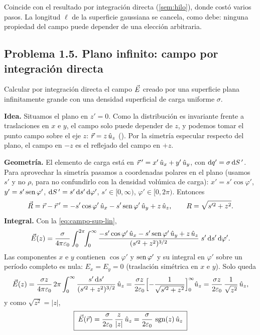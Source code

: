 \begin{observacion}[Comparación]
Coincide con el resultado por integración directa (\cref{sem:hilo}), donde costó varios pasos. La longitud $\ell$ de la superficie gaussiana se cancela, como debe: ninguna propiedad del campo puede depender de una elección arbitraria.
\end{observacion}



\subsection{Problema 1.5. Plano infinito: campo por integración directa}\label{sem:plano}
\begin{ejercicio}\label{ejer:plano}
Calcular por integración directa el campo $\vec{E}$ creado por una superficie plana infinitamente grande con una densidad superficial de carga uniforme $\sigma$.
\end{ejercicio}

\begin{resolucion}
\textbf{Idea.} Situamos el plano en $z'=0$. Como la distribución es invariante frente a traslaciones en $x$ e $y$, el campo solo puede depender de $z$, y podemos tomar el punto campo sobre el eje $z$: $\vec{r}=z\,\hat{u}_{z}$
(). Por la simetría especular respecto del plano, el campo en $-z$ es el reflejado del campo en $+z$.

\textbf{Geometría.} El elemento de carga está en $\vec{r}\,'=x'\,\hat{u}_{x}+y'\,\hat{u}_{y}$, con $\mathrm{d} q'=\sigma\,\mathrm{d} S\,'$. Para aprovechar la simetría pasamos a coordenadas polares en el plano (usamos $s'$ y no $\rho$, para no
confundirlo con la densidad volúmica de carga): $x'=s'\cos\varphi'$, $y'=s'\operatorname{sen}\varphi'$, $\mathrm{d} S\,'=s'\,\mathrm{d} s'\,\mathrm{d}\varphi'$, $s'\in[0,\infty)$, $\varphi'\in[0,2\pi)$. Entonces
\[
  \vec{R}=\vec{r}-\vec{r}\,'=-s'\cos\varphi'\,\hat{u}_{x}-s'\operatorname{sen}\varphi'\,\hat{u}_{y}+z\,\hat{u}_{z},\qquad R=\sqrt{s'^{2}+z^{2}} .
\]
\textbf{Integral.} Con la \cref{eq:campo-sup-lin},
\[
  \vec{E}(z)=\frac{\sigma}{4\pi\varepsilon_{0}}\int_{0}^{2\pi}\!\!\int_{0}^{\infty}\frac{-s'\cos\varphi'\,\hat{u}_{x}-s'\operatorname{sen}\varphi'\,\hat{u}_{y}+z\,\hat{u}_{z}}{(s'^{2}+z^{2})^{3/2}}\;s'\,\mathrm{d} s'\,\mathrm{d}\varphi' .
\]
Las componentes $x$ e $y$ contienen $\cos\varphi'$ y $\operatorname{sen}\varphi'$ y su integral en $\varphi'$ sobre un período completo es nula: $E_x=E_y=0$ (traslación simétrica en $x$ e $y$). Solo queda
\[
  \vec{E}(z)=\frac{\sigma z}{4\pi\varepsilon_{0}}\,2\pi\int_{0}^{\infty}\frac{s'\,\mathrm{d} s'}{(s'^{2}+z^{2})^{3/2}}\,\hat{u}_{z}=\frac{\sigma z}{2\varepsilon_{0}}\Bigl[-\frac{1}{\sqrt{s'^{2}+z^{2}}}\Bigr]_{0}^{\infty}\hat{u}_{z}=\frac{\sigma z}{2\varepsilon_{0}}\,\frac{1}{\sqrt{z^{2}}}\,\hat{u}_{z},
\]
y como $\sqrt{z^{2}}=\lvert z\rvert$,
\[
  \boxed{\;\vec{E}(\vec{r})=\frac{\sigma}{2\varepsilon_{0}}\,\frac{z}{\lvert z\rvert}\,\hat{u}_{z}=\frac{\sigma}{2\varepsilon_{0}}\,\operatorname{sgn}(z)\,\hat{u}_{z}\;}
\]
\end{resolucion}

